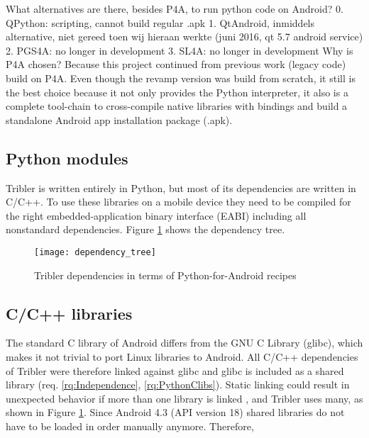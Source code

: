 What alternatives are there, besides P4A, to run python code on Android?
0. QPython: scripting, cannot build regular .apk
1. QtAndroid, inmiddels alternative, niet gereed toen wij hieraan werkte (juni 2016, qt 5.7 android service)
2. PGS4A: no longer in development
3. SL4A: no longer in development
Why is P4A chosen?
Because this project continued from previous work (legacy code) build on P4A.
Even though the revamp version was build from scratch, it still is the best choice because it not only provides the Python interpreter, it also is a complete tool-chain to cross-compile native libraries with bindings and build a standalone Android app installation package (.apk).

\subsection{Python modules}
Tribler is written entirely in Python, but most of its dependencies are written in C/C++.
To use these libraries on a mobile device they need to be compiled for the right embedded-application binary interface (EABI) including all nonstandard dependencies.
Figure \ref{fig:dependency_tree} shows the dependency tree.

\begin{figure}[H]
	\centering
	\texttt{[image: dependency\_tree]}
	\caption{Tribler dependencies in terms of Python-for-Android recipes}
	\label{fig:dependency_tree}
\end{figure}


\subsection{C/C++ libraries}\label{sec:libc}
The standard C library of Android differs from the GNU C Library (glibc), which makes it not trivial to port Linux libraries to Android.
All C/C++ dependencies of Tribler were therefore linked against glibc and glibc is included as a shared library (req. \ref{rq:Independence}, \ref{rq:PythonClibs}).
Static linking could result in unexpected behavior if more than one library is linked \cite{android-cpp}, and Tribler uses many, as shown in Figure \ref{fig:dependency_tree}.
Since Android 4.3 (API version 18) shared libraries do not have to be loaded in order manually anymore.
Therefore, 

